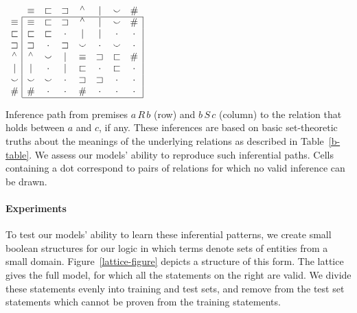 \begin{table}[htp]
  \centering  \small
  \setlength{\arraycolsep}{8pt}
  \renewcommand{\arraystretch}{1.1}
  \newcommand{\UNK}{\cdot}  
  $\begin{array}[t]{c@{ \ }|*{7}{c}|}
    \multicolumn{1}{c}{}
             & \nateq     & \natfor     & \natrev     & \natneg    & \natalt     & \natcov     & \multicolumn{1}{c}{\natind} \\
    \cline{2-8}
    \nateq  & \nateq &   \natfor &  \natrev &  \natneg &   \natalt &  \natcov &  \natind \\
    \natfor & \natfor &  \natfor &  \UNK &  \natalt &   \natalt &  \UNK &  \UNK \\
    \natrev & \natrev &  \UNK &  \natrev &  \natcov &   \UNK &  \natcov &  \UNK \\
    \natneg & \natneg &  \natcov &  \natalt &  \nateq &    \natrev &  \natfor &  \natind \\
    \natalt & \natalt &  \UNK &  \natalt &  \natfor &   \UNK &  \natfor &  \UNK \\
    \natcov & \natcov &  \natcov &  \UNK &  \natrev &   \natrev &  \UNK &  \UNK \\
    \natind & \natind & \UNK &  \UNK &  \natind &  \UNK &  \UNK &  \UNK \\
    \cline{2-8}
  \end{array}$
  \caption{Inference path from premises $a\,R\,b$ (row) and $b\,S\,c$ (column) to the relation that holds between $a$ and $c$, if any.  These inferences are based on basic set-theoretic truths about the meanings of the underlying relations as described in Table~\ref{b-table}. We assess our models' ability to reproduce such inferential paths. Cells containing a dot correspond to pairs
of relations for which no valid inference can be drawn.}
  \label{tab:jointable}
\end{table}

\paragraph{Experiments}
To test our models' ability to learn these inferential patterns, we
create small boolean structures for our logic in which terms denote
sets of entities from a small domain.  Figure~\ref{lattice-figure}
depicts a structure of this form. The lattice gives the full model,
for which all the statements on the right are valid. We divide these
statements evenly into training and test sets, and remove from the
test set statements which cannot be proven from the training
statements.

